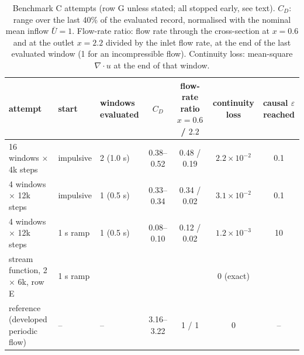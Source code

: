 \begin{table}[t]
\centering
\caption{Benchmark C attempts (row G unless stated; all stopped early, see text). $C_D$: range over the last 40\%
of the evaluated record, normalised with the nominal mean inflow $\bar U=1$. Flow-rate ratio: flow rate through the
cross-section at $x=0.6$ and at the outlet $x=2.2$ divided by the inlet flow rate, at the end of the last evaluated
window (1 for an incompressible flow). Continuity loss: mean-square $\nabla\cdot u$ at the end of that window.}
\label{tab:cylinder}
\small
\begin{tabular}{@{}lllcccc@{}}
\toprule
attempt & start & windows evaluated & $C_D$ & flow-rate ratio $x=0.6$ / $2.2$ & continuity loss & causal $\varepsilon$ reached\\
\midrule
16 windows $\times$ 4k steps & impulsive & 2 (1.0 s) & 0.38--0.52 & 0.48 / 0.19 & $2.2\times10^{-2}$ & 0.1\\
4 windows $\times$ 12k steps & impulsive & 1 (0.5 s) & 0.33--0.34 & 0.34 / 0.02 & $3.1\times10^{-2}$ & 0.1\\
4 windows $\times$ 12k steps & 1 s ramp & 1 (0.5 s) & 0.08--0.10 & 0.12 / 0.02 & $1.2\times10^{-3}$ & 10\\
stream function, 2 $\times$ 6k, row E & 1 s ramp & \pending{} & \pending{} & \pending{} & 0 (exact) & \pending{}\\
\midrule
reference (developed periodic flow) & -- & -- & 3.16--3.22 & 1 / 1 & 0 & --\\
\bottomrule
\end{tabular}
\end{table}
